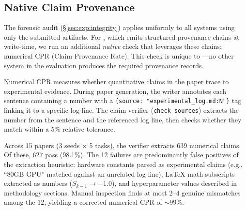 
\subsection{Native Claim Provenance}
\label{sec:exp:native_cpr}

The forensic audit (\S\ref{sec:exp:integrity}) applies uniformly to all systems using only the submitted artifacts.
For \sys{}, which emits structured provenance chains at write-time, we run an additional \emph{native} check that leverages these chains: numerical CPR (Claim Provenance Rate).
This check is unique to \sys{}---no other system in the evaluation produces the required provenance records.

Numerical CPR measures whether quantitative claims in the paper trace to experimental evidence.
During paper generation, the writer annotates each sentence containing a number with a \texttt{\{source: "experimental\_log.md:N"\}} tag linking it to a specific log line.
The claim verifier (\texttt{check\_sources}) extracts the number from the sentence and the referenced log line, then checks whether they match within a 5\% relative tolerance.

Across 15 papers (3 seeds $\times$ 5 tasks), the verifier extracts 639 numerical claims.
Of these, 627 pass (98.1\%).
The 12 failures are predominantly false positives of the extraction heuristic: hardware constants parsed as experimental claims (e.g., ``80GB GPU'' matched against an unrelated log line), LaTeX math subscripts extracted as numbers ($S_{k-1} \to -1.0$), and hyperparameter values described in methodology sections.
Manual inspection finds at most 2--4 genuine mismatches among the 12, yielding a corrected numerical CPR of ${\sim}99\%$.
